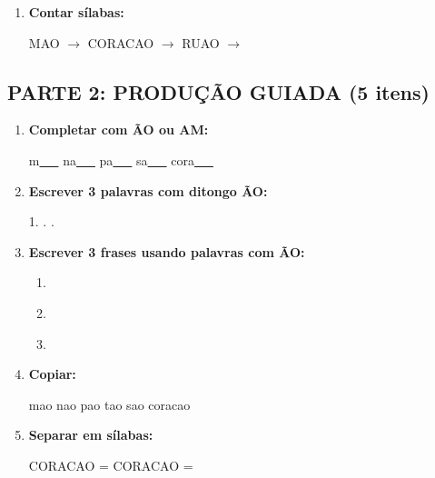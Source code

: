 \begin{exercicio}
\begin{enumerate}
  \item \textbf{Contar sílabas:}
  \begin{center}
  MAO $\rightarrow$ \underline{\hspace{1cm}} \quad CORACAO $\rightarrow$ \underline{\hspace{1cm}} \quad RUAO $\rightarrow$ \underline{\hspace{1cm}}
  \end{center}
\end{enumerate}

\subsection*{PARTE 2: PRODUÇÃO GUIADA (5 itens)}

\begin{enumerate}[resume]
  \item \textbf{Completar com \~AO ou AM:}
  \begin{center}
  m\underline{~~~} \quad na\underline{~~~} \quad pa\underline{~~~} \quad sa\underline{~~~} \quad cora\underline{~~~}
  \end{center}

  \item \textbf{Escrever 3 palavras com ditongo \~AO:}
  \begin{center}
  1. \underline{\hspace{3cm}} . \underline{\hspace{3cm}} . \underline{\hspace{3cm}}
  \end{center}

  \item \textbf{Escrever 3 frases usando palavras com \~AO:}
  \begin{enumerate}[label=\alph*)]
    \item \underline{\hspace{8cm}}
    \item \underline{\hspace{8cm}}
    \item \underline{\hspace{8cm}}
  \end{enumerate}

  \item \textbf{Copiar:}
  \begin{center}
  mao \quad nao \quad pao \quad tao \quad sao \quad coracao
  \end{center}

  \item \textbf{Separar em sílabas:}
  \begin{center}
  CORACAO = \underline{\hspace{1cm}} \underline{\hspace{1cm}} \underline{\hspace{1cm}} \quad CORACAO = \underline{\hspace{1cm}} \underline{\hspace{1cm}} \underline{\hspace{1cm}}
  \end{center}
\end{enumerate}


\end{exercicio}
